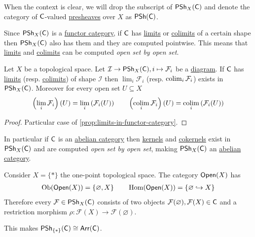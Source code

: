 \documentclass[../../../main]{subfiles}
\begin{document}
\begin{notation}
  When the context is clear, we will drop the subscript of \(\mathsf{PSh}_{X}(\mathsf{C})\) and denote the category of \(\mathsf{C}\)-valued \hyperref[def:presheaf]{presheaves} over \(X\) as \(\mathsf{PSh}(\mathsf{C})\).
\end{notation}

Since \(\mathsf{PSh}_{X}(\mathsf{C})\) is a \hyperref[def:functor-category]{functor category}, if \(\mathsf{C}\) has \hyperref[def:categorical-limit]{limits} or \hyperref[def:categorical-colimit]{colimits} of a certain shape then \(\mathsf{PSh}_{X}(\mathsf{C})\) also has them and they are computed pointwise.
This means that \hyperref[def:categorical-limit]{limits} and \hyperref[def:categorical-colimit]{colimits} can be computed \textit{open set by open set}.

\begin{proposition} \label{prop:limits-colimits-presheaf}
  Let \(X\) be a topological space.
  Let \(\mathcal{I} \to \mathsf{PSh}_{X}(\mathsf{C}), i \mapsto \mathcal{F}_{i}\) be a \hyperref[def:diagram]{diagram}.
  If \(\mathsf{C}\) has \hyperref[def:categorical-limit]{limits} (resp. \hyperref[def:categorical-colimit]{colimits}) of shape \(\mathcal{I}\) then \(\lim_{i} \mathcal{F}_{i}\) (resp. \(\operatorname*{colim}_{i} \mathcal{F}_{i}\)) exists in \(\mathsf{PSh}_{X}(\mathsf{C})\).
  Moreover for every open set \(U \subseteq X\)
  \begin{align*}
    \left( \lim_{i} \mathcal{F}_{i} \right)(U) = \lim_{i} \left( \mathcal{F}_{i}(U) \right) \qquad \left( \operatorname*{colim}_{i} \mathcal{F}_{i} \right)(U) = \operatorname*{colim}_{i} \left( \mathcal{F}_{i}(U) \right)
  \end{align*}
\end{proposition}
\begin{proof}
  Particular case of \autoref{prop:limits-in-functor-category}.
\end{proof}


In particular if \(\mathsf{C}\) is an \hyperref[def:abelian-category]{abelian category} then \hyperref[def:categorical-kernel]{kernels} and \hyperref[def:categorical-cokernel]{cokernels} exist in \(\mathsf{PSh}_{X}(\mathsf{C})\) and are computed \textit{open set by open set}, making \(\mathsf{PSh}_{X}(\mathsf{C})\) an \hyperref[def:abelian-category]{abelian category}.

\begin{example} \label{ex:one-point-presheaf}
  Consider \(X = \{\ast\}\) the one-point topological space.
  The category \(\mathsf{Open}(X)\) has
  \begin{align*}
    \operatorname{Ob}(\mathsf{Open}(X)) = \{\varnothing, X \} \qquad \operatorname{Hom}(\mathsf{Open}(X)) = \{\varnothing \hookrightarrow X\}
  \end{align*}
  Therefore every \(\mathcal{F} \in \mathsf{PSh}_{X}(\mathsf{C})\) consists of two objects \(\mathcal{F}(\varnothing), \mathcal{F}(X) \in \mathsf{C}\) and a restriction morphism \(\rho: \mathcal{F}(X) \to \mathcal{F}(\varnothing)\).

  This makes \(\mathsf{PSh}_{\{\ast\}}(\mathsf{C}) \cong \mathsf{Arr}(\mathsf{C})\).
\end{example}
\end{document}
